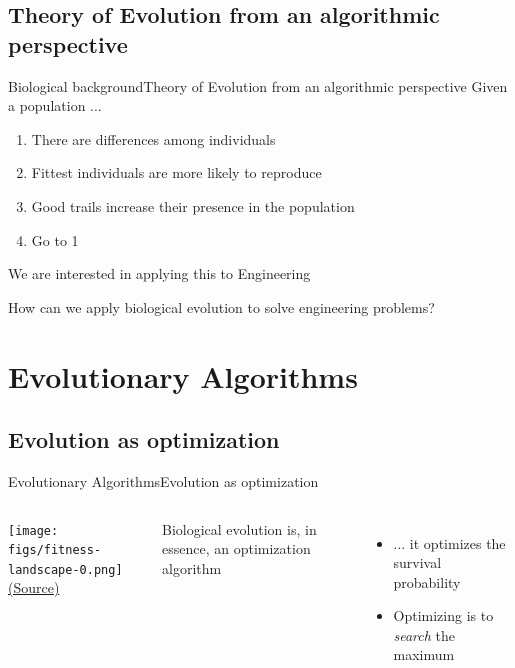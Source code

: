 \documentclass[10pt,compress]{beamer} %
\begin{document}
\subsection{{Theory of Evolution from an algorithmic perspective}}
\begin{frame}{Biological background}{Theory of Evolution from an algorithmic perspective}
	Given a population ...
	\begin{enumerate}
	\item There are differences among individuals
	\item Fittest individuals are more likely to reproduce
	\item Good trails increase their presence in the population
	\item Go to 1
	\end{enumerate}
	We are interested in applying this to Engineering
\end{frame}

\begin{frame}[plain]{}
	\begin{center}
	How can we apply biological evolution to solve engineering problems?
	\end{center}
\end{frame}

\section{Evolutionary Algorithms}
\subsection{Evolution as optimization}
\begin{frame}{Evolutionary Algorithms}{Evolution as optimization}
    \begin{columns}
	\begin{center}
	\texttt{[image: figs/fitness-landscape-0.png]}\\
		\tiny \href{http://2.bp.blogspot.com/-32R9V6X6rXU/T-tr1lZIwCI/AAAAAAAAAFI/t05ioQ5GP80/s1600/Fitness-Landscape.gif}{(Source)}
	\end{center}
	Biological evolution is, in essence, an optimization algorithm
	\begin{itemize}
	\item ... it optimizes the survival probability
	\item Optimizing is to \textit{search} the maximum
	\end{itemize}
	\end{columns}
\end{frame}
\end{document}
